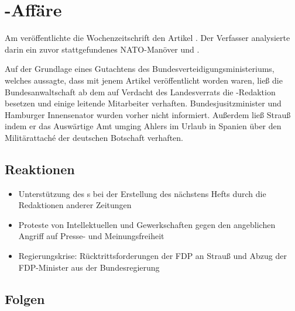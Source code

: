 \section[\ins{Spiegel}-Affäre]{-Affäre}
\label{sec:spiegaff}

Am  veröffentlichte die Wochenzeitschrift
 den Artikel . Der Verfasser  analysierte darin ein zuvor stattgefundenes
NATO-Manöver und .

Auf der Grundlage eines Gutachtens des
Bundesverteidigungsministeriums, welches aussagte, dass mit jenem
Artikel  veröffentlicht worden
waren, ließ die Bundesanwaltschaft ab dem  auf
Verdacht des Landesverrats die -Redaktion besetzen und
einige leitende Mitarbeiter verhaften. Bundesjusitzminister
 und Hamburger
Innensenator  wurden vorher nicht
informiert.  Außerdem ließ Strauß indem er das Auswärtige Amt umging
Ahlers im Urlaub in Spanien über den Militärattaché der deutschen
Botschaft verhaften.

\subsection*{Reaktionen}

\begin{itemize}
\item Unterstützung des s bei der Erstellung des
nächstens Hefts durch die Redaktionen anderer Zeitungen
\item Proteste von Intellektuellen und Gewerkschaften gegen den
angeblichen Angriff auf Presse- und Meinungsfreiheit
\item Regierungskrise: Rücktrittsforderungen der FDP an Strauß und
Abzug der FDP-Minister aus der Bundesregierung
\end{itemize}


\subsection*{Folgen}

